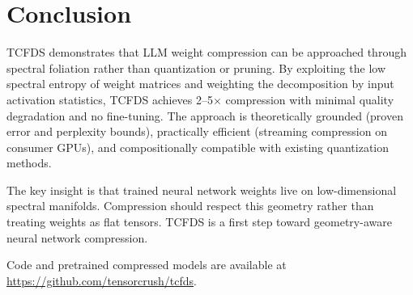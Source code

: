\documentclass[11pt,a4paper]{article}
\begin{document}
\section{Conclusion}

TCFDS demonstrates that LLM weight compression can be approached through spectral foliation rather than quantization or pruning. By exploiting the low spectral entropy of weight matrices and weighting the decomposition by input activation statistics, TCFDS achieves 2--5$\times$ compression with minimal quality degradation and no fine-tuning. The approach is theoretically grounded (proven error and perplexity bounds), practically efficient (streaming compression on consumer GPUs), and compositionally compatible with existing quantization methods.

The key insight is that trained neural network weights live on low-dimensional spectral manifolds. Compression should respect this geometry rather than treating weights as flat tensors. TCFDS is a first step toward geometry-aware neural network compression.

Code and pretrained compressed models are available at \url{https://github.com/tensorcrush/tcfds}.
\end{document}
